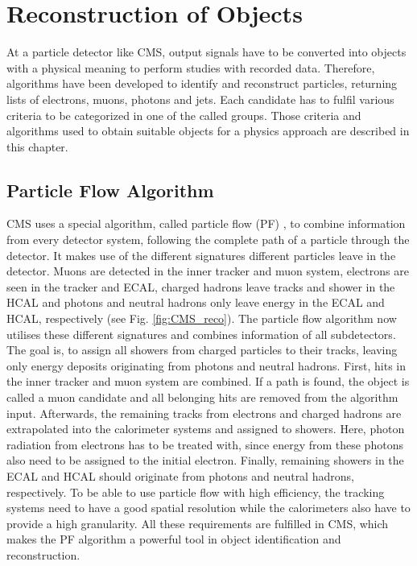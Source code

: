 \chapter{Reconstruction of Objects}
\label{ch:Reco}
	At a particle detector like CMS, output signals have to be converted into objects with a physical meaning to perform studies with recorded data. Therefore, algorithms have been developed to identify and reconstruct particles, returning lists of electrons, muons, photons and jets. Each candidate has to fulfil various criteria to be categorized in one of the called groups. Those criteria and algorithms used to obtain suitable objects for a physics approach are described in this chapter.

\section{Particle Flow Algorithm}
\label{sec:pf}
	CMS uses a special algorithm, called particle flow (PF) \cite{particleflow}, to combine information from every detector system, following the complete path of a particle through the detector. It makes use of the different signatures different particles leave in the detector. Muons are detected in the inner tracker and muon system, electrons are seen in the tracker and ECAL, charged hadrons leave tracks and shower in the HCAL and photons and neutral hadrons only leave energy in the ECAL and HCAL, respectively (see Fig. \ref{fig:CMS_reco}). The particle flow algorithm now utilises these different signatures and combines information of all subdetectors. The goal is, to assign all showers from charged particles to their tracks, leaving only energy deposits originating from photons and neutral hadrons. First, hits in the inner tracker and muon system are combined. If a path is found, the object is called a muon candidate and all belonging hits are removed from the algorithm input. Afterwards, the remaining tracks from electrons and charged hadrons are extrapolated into the calorimeter systems and assigned to showers. Here, photon radiation from electrons has to be treated with, since energy from these photons also need to be assigned to the initial electron. Finally, remaining showers in the ECAL and HCAL should originate from photons and neutral hadrons, respectively. To be able to use particle flow with high efficiency, the tracking systems need to have a good spatial resolution while the calorimeters also have to provide a high granularity. All these requirements are fulfilled in CMS, which makes the PF algorithm a powerful tool in object identification and reconstruction.

